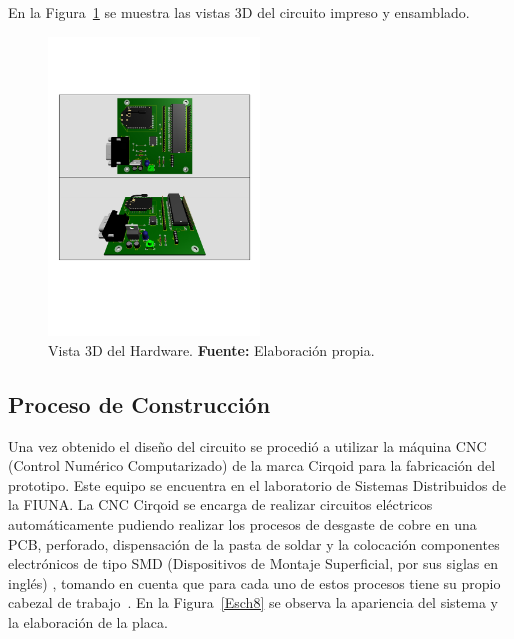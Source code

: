 


En la Figura~\ref{Esch7} se muestra las vistas 3D del circuito impreso y ensamblado. 

\begin{figure}[H]
	\centering
		\includegraphics[trim = 10mm 60mm 5mm 50mm, clip, width=0.5\textwidth]{./Cap4imagen/3d_can_4.pdf}
	\caption[Vista 3D del Hardware.]{Vista 3D del Hardware.\textbf{ Fuente:} Elaboración propia.}
	\label{Esch7} %
\end{figure}


\subsection{Proceso de Construcción}

Una vez obtenido el diseño del circuito se procedió a utilizar la máquina CNC (Control Numérico Computarizado)  de la marca Cirqoid para la fabricación del prototipo. 
Este equipo se encuentra en el laboratorio de Sistemas Distribuidos de la FIUNA. 
La CNC Cirqoid se encarga de realizar circuitos eléctricos automáticamente  pudiendo realizar los procesos de desgaste de cobre en una PCB, perforado, dispensación de la pasta de soldar y la colocación componentes electrónicos de tipo SMD (Dispositivos de Montaje Superficial, por sus siglas en inglés) , tomando en cuenta que para cada uno de estos procesos tiene su propio cabezal de trabajo~\cite{cirq}. 
En la Figura~\ref{Esch8} se observa la apariencia del sistema y la elaboración de la placa. 

